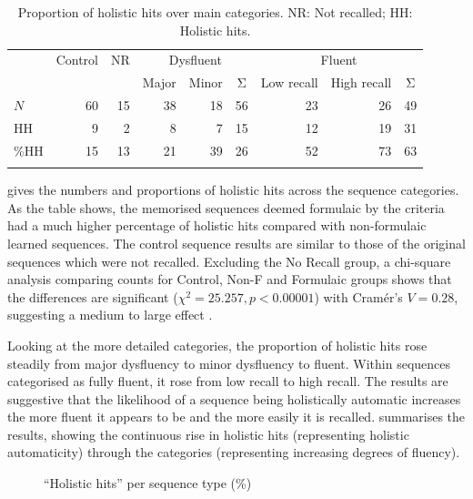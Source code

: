 \documentclass[output=paper]{langscibook}
\begin{document}
\begin{table}
\begin{tabular}{lrrrrcrrc}
\lsptoprule
    & Control & NR & \multicolumn{3}{c}{Dysfluent} & \multicolumn{3}{c}{Fluent}\\\cmidrule(lr){4-6}\cmidrule(lr){7-9}
    &         &              & Major & Minor & Σ             & Low recall & High recall & Σ\\\midrule
$N$ & 60      & 15           & 38 & 18 & 56                  & 23 & 26 & 49\\ 
HH  & 9       & 2            & 8  & 7  & 15                  & 12 & 19 & 31\\
\%HH& 15      & 13           & 21 & 39 & 26                  & 52 & 73 & 63\\\lspbottomrule
\end{tabular}
\caption{Proportion of holistic hits over main categories. NR: Not recalled; HH: Holistic hits.\label{tab:cutler:6}}
\end{table}

 gives the numbers and proportions of holistic hits across the sequence categories. As the table shows, the memorised sequences deemed formulaic by the criteria had a much higher percentage of holistic hits compared with non-formulaic learned sequences. The control sequence results are similar to those of the original sequences which were not recalled. Excluding the No Recall group, a chi-square analysis comparing counts for Control, Non-F and Formulaic groups shows that the differences are significant ($\chi^2=25.257, p<0.00001$) with Cramér's  $V=0.28$, suggesting a medium to large effect \citep{Cohen1988}.

Looking at the more detailed categories, the proportion of holistic hits rose steadily from major dysfluency to minor dysfluency to fluent. Within sequences categorised as fully fluent, it rose from low recall to high recall. The results are suggestive that the likelihood of a sequence being holistically automatic increases the more fluent it appears to be and the more easily it is recalled.  summarises the results, showing the continuous rise in holistic hits (representing holistic automaticity) through the categories (representing increasing degrees of fluency).

\begin{figure}
\caption{``Holistic hits'' per sequence type (\%)\label{fig:cutler:3}}
\end{figure}
\end{document}

